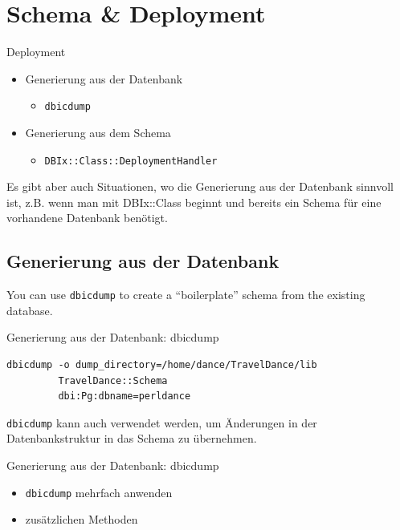 
\section{Schema \& Deployment}

\begin{frame}[fragile]{Deployment}
\begin{itemize}
\item Generierung aus der Datenbank
\begin{itemize}
\item \verb|dbicdump|
\end{itemize}
\item Generierung aus dem Schema
\begin{itemize}
\item \verb|DBIx::Class::DeploymentHandler|
\end{itemize}
\end{itemize}
\end{frame}

Es gibt aber auch Situationen, wo die
Generierung aus der Datenbank sinnvoll ist,
z.B. wenn man mit DBIx::Class beginnt und
bereits ein Schema für eine vorhandene
Datenbank benötigt.


\subsection{Generierung aus der Datenbank}

You can use \verb|dbicdump| to create a ``boilerplate'' schema from the
existing database.

\begin{frame}[fragile]{Generierung aus der Datenbank: dbicdump}
\begin{lstlisting}
dbicdump -o dump_directory=/home/dance/TravelDance/lib 
         TravelDance::Schema 
         dbi:Pg:dbname=perldance
\end{lstlisting}
\end{frame}

\verb|dbicdump| kann auch verwendet werden, um Änderungen in
der Datenbankstruktur in das Schema zu übernehmen.

\begin{frame}[fragile]{Generierung aus der Datenbank: dbicdump}
\begin{itemize}
\item \verb|dbicdump| mehrfach anwenden
\item zusätzlichen Methoden
\end{itemize}
\end{frame}

